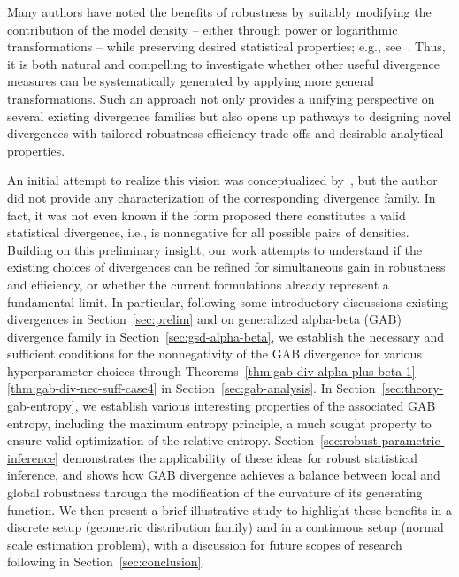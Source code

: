 \documentclass[11pt]{article}
\theoremstyle{plain}
\theoremstyle{remark}
\begin{document}
Many authors have noted the benefits of robustness by suitably modifying the contribution of the model density -- either through power or logarithmic transformations -- while preserving desired statistical properties; e.g., see~\citep{basu1998robust, basu2011statistical, cichocki2010families, ghosh2013robust,ghosh2017generalized, roy2024robust}. Thus, it is both natural and compelling to investigate whether other useful divergence measures can be systematically generated by applying more general transformations. Such an approach not only provides a unifying perspective on several existing divergence families but also opens up pathways to designing novel divergences with tailored robustness-efficiency trade-offs and desirable analytical properties.

An initial attempt to realize this vision was conceptualized by~\cite[Eq. (1)]{maji2014logarithmic}, but the author did not provide any characterization of the corresponding divergence family. In fact, it was not even known if the form proposed there constitutes a valid statistical divergence, i.e., is nonnegative for all possible pairs of densities. Building on this preliminary insight, our work attempts to understand if the existing choices of divergences can be refined for simultaneous gain in robustness and efficiency, or whether the current formulations already represent a fundamental limit. In particular, following some introductory discussions existing divergences in Section~\ref{sec:prelim} and on generalized alpha-beta (GAB) divergence family in Section~\ref{sec:gsd-alpha-beta}, we establish the necessary and sufficient conditions for the nonnegativity of the GAB divergence for various hyperparameter choices through Theorems~\ref{thm:gab-div-alpha-plus-beta-1}-\ref{thm:gab-div-nec-suff-case4} in Section~\ref{sec:gab-analysis}. In Section~\ref{sec:theory-gab-entropy}, we establish various interesting properties of the associated GAB entropy, including the maximum entropy principle, a much sought property to ensure valid optimization of the relative entropy. Section~\ref{sec:robust-parametric-inference} demonstrates the applicability of these ideas for robust statistical inference, and shows how GAB divergence achieves a balance between local and global robustness through the modification of the curvature of its generating function. We then present a brief illustrative study to highlight these benefits in a discrete setup (geometric distribution family) and in a continuous setup (normal scale estimation problem), with a discussion for future scopes of research following in Section~\ref{sec:conclusion}.
\end{document}
